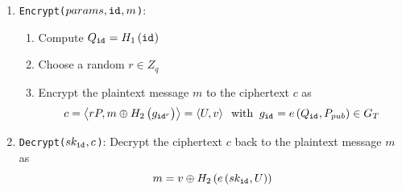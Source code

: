 \begin{algorithm}
\begin{enumerate}
\begin{enumerate}
   \end{enumerate}
   \item \texttt{Encrypt($params, \mathtt{id}_{}, m$)}:
   \begin{enumerate}
    \item Compute $Q_{\mathtt{id}_{}} = H_1 \left( \mathtt{id}_{} \right)$
    \item Choose a random $r \in Z_q$
    \item Encrypt the plaintext message $m$ to the ciphertext $c$ as
    \begin{equation*}
     c = \left< rP, m \oplus H_2 \left( g_{\mathtt{id}_{}^r} \right) \right> = \left< U, v \right> \; \; \textrm{with} \; \; g_{\mathtt{id}_{}} = e \left( Q_{\mathtt{id}_{}}, P_{pub} \right) \in G_T
    \end{equation*}
   \end{enumerate}
   \item \texttt{Decrypt($sk_{\mathtt{id}_{}}, c$)}: Decrypt the ciphertext $c$ back to the plaintext message $m$ as
   \begin{equation*}
    m = v \oplus H_2 \left( e \left( sk_{\mathtt{id}_{}}, U \right) \right)
   \end{equation*}
 \end{enumerate}
\end{algorithm}

